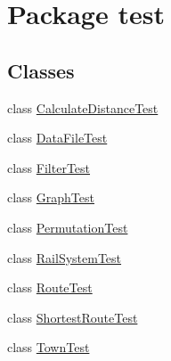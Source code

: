\hypertarget{namespacetest}{}\section{Package test}
\label{namespacetest}
\subsection*{Classes}
\begin{DoxyCompactItemize}
\item 
class \hyperlink{classtest_1_1_calculate_distance_test}{Calculate\+Distance\+Test}
\item 
class \hyperlink{classtest_1_1_data_file_test}{Data\+File\+Test}
\item 
class \hyperlink{classtest_1_1_filter_test}{Filter\+Test}
\item 
class \hyperlink{classtest_1_1_graph_test}{Graph\+Test}
\item 
class \hyperlink{classtest_1_1_permutation_test}{Permutation\+Test}
\item 
class \hyperlink{classtest_1_1_rail_system_test}{Rail\+System\+Test}
\item 
class \hyperlink{classtest_1_1_route_test}{Route\+Test}
\item 
class \hyperlink{classtest_1_1_shortest_route_test}{Shortest\+Route\+Test}
\item 
class \hyperlink{classtest_1_1_town_test}{Town\+Test}
\end{DoxyCompactItemize}
